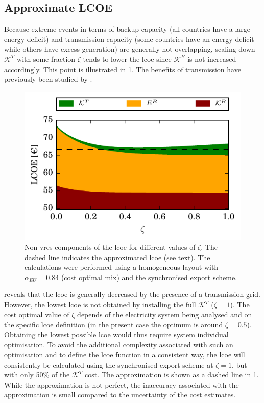\documentclass[a4paper, 5p, sort&compress]{elsarticle}%
\begin{document}
\subsection{Approximate LCOE}
\label{sec:approximate-lcoe}


Because extreme events in terms of backup capacity (all countries have
a large energy deficit) and transmission capacity (some countries have
an energy deficit while others have excess generation) are generally
not overlapping, scaling down $\mathcal{K}^{T}$ with some fraction
$\zeta$ tends to lower the \gls{lcoe} since $\mathcal{K}^{B}$ is not increased
accordingly. This point is illustrated in
\cref{fig:transmission-lcoe}. The benefits of transmission have
previously been studied by \cite{Rodriguez2013}.

\begin{figure}[h!]
  \centering
  \includegraphics[width = \columnwidth]{constrainedSync-new}
  \caption{Non \gls{vres} components of the \gls{lcoe} for different values of $\zeta$.
    The dashed line indicates the approximated \gls{lcoe} (see text). The calculations were
    performed using a homogeneous layout with $\alpha_{EU} = 0.84$
    (cost optimal mix) and the synchronised export scheme.}
  \label{fig:transmission-lcoe}
\end{figure}

 reveals that the \gls{lcoe} is generally decreased by the presence
of a transmission grid. However, the lowest \gls{lcoe} is not obtained by installing the full
$\mathcal{K}^{T}$
($\zeta = 1$).
The cost optimal value of $\zeta$
depends of the electricity system being analysed and on the specific \gls{lcoe} definition (in
the present case the optimum is around $\zeta= 0.5$).
Obtaining the lowest possible \gls{lcoe} would thus require system individual optimisation. To
avoid the additional complexity associated with such an optimisation and to define the
\gls{lcoe} function in a consistent way, the \gls{lcoe} will consistently be calculated using
the synchronised export scheme at $\zeta=1$,
but with only 50\% of the $\mathcal{K}^{T}$
cost. The approximation is shown as a dashed line in \cref{fig:transmission-lcoe}. While the
approximation is not perfect, the inaccuracy associated with the approximation is small
compared to the uncertainty of the cost estimates.
\end{document}
